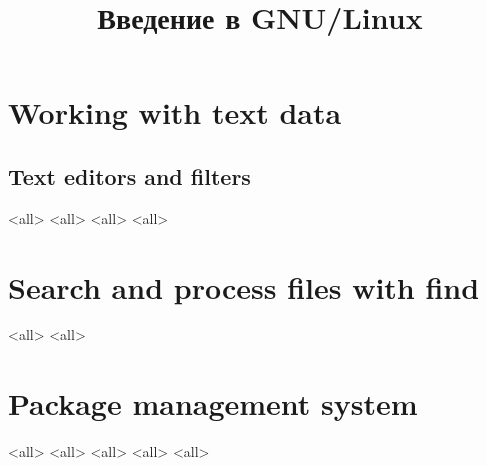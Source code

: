 

\title{Введение в GNU/Linux}








\begin{frame}
	\frametitle{}
	\titlepage
	\vspace{-0.5cm}
	\begin{center}
	\end{center}
\end{frame}





\section{Working with text data}

\subsection{Text editors and filters}
\mode<all>{}
\mode<all>{} 
\mode<all>{} 
\mode<all>{}

\section{Search and process files with find}
\mode<all>{}
\mode<all>{}

\section{Package management system}
\mode<all>{}
\mode<all>{}
\mode<all>{}
\mode<all>{}
\mode<all>{}


